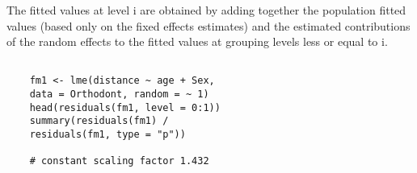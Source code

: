 \documentclass[Main.tex]{subfiles}
\begin{document}
The fitted values at level i are obtained by adding together the population fitted values (based only on the fixed effects estimates) and the estimated contributions of the random effects to the fitted values at grouping levels less or equal to i.


\begin{framed}
	\begin{verbatim}
	
	fm1 <- lme(distance ~ age + Sex, 
	data = Orthodont, random = ~ 1)
	head(residuals(fm1, level = 0:1))
	summary(residuals(fm1) /
	residuals(fm1, type = "p")) 
	
	# constant scaling factor 1.432
	
	\end{verbatim}
\end{framed}




	
	
	
	
	
	
	
\end{document}

